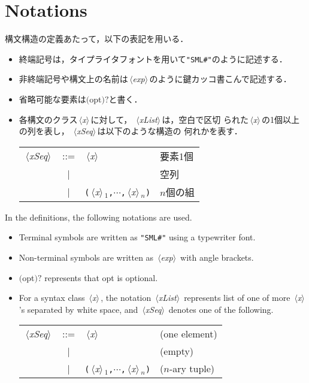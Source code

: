 \documentclass{jbook}
\newcommand{\txt}[2]{#2}
\newcommand{\vbar}{\mbox{\ $|$\ }}
\newcommand{\nonterm}[1]{\mbox{$\,\langle$}{\it #1}\mbox{$\rangle\,$}}
\newcommand{\term}[1]{\mbox{{\tt #1}}}
\newcommand{\optional}[1]{\mbox{$($}{\protect #1}\mbox{$)?$}}
\begin{document}
\section{\txt{使用する表記法}{Notations}}

\ifjp%
	構文構造の定義あたって，以下の表記を用いる．
\begin{itemize}
\item 終端記号は，タイプライタフォントを用いて\term{"SML\#"}のように記述する．
\item 非終端記号や構文上の名前は\nonterm{exp}のように鍵カッコ書こんで記述する．
\item 省略可能な要素は\optional{opt}と書く．
\item 
	各構文のクラス\nonterm{x}に対して，
\nonterm{xList}は，空白で区切
られた\nonterm{x}の1個以上の列を表し，
\nonterm{xSeq}は以下のような構造の
何れかを表す．

\begin{tabular}{lcll}
\nonterm{xSeq} &::=& \nonterm{x} & 要素1個\\
&\vbar& & 空列\\
&\vbar& \term{(}\nonterm{x}$_1$\term{,}$\cdots${\tt,}\nonterm{x}$_n$\term{)} &$n$個の組
\end{tabular}

	

\end{itemize}	
\else%
	In the definitions, the following notations are used.
\begin{itemize}
\item Terminal symbols are written as \term{"SML\#"}  using a typewriter
font.
\item Non-terminal symbols are written as \nonterm{exp} with angle brackets.
\item \optional{opt} represents that opt is optional.
\item 
	For a syntax class \nonterm{x}, 
the notation 
\nonterm{xList} represents list of one of more \nonterm{x}'s separated
by white space, and 
\nonterm{xSeq} denotes one of the following.

\begin{tabular}{lcll}
\nonterm{xSeq} &::=& \nonterm{x} & (one element)\\
&\vbar& & (empty)\\
&\vbar& \term{(}\nonterm{x}$_1$\term{,}$\cdots${\tt,}\nonterm{x}$_n$\term{)} &
($n$-ary tuple)
\end{tabular}

\end{itemize}	
\fi%
\end{document}
